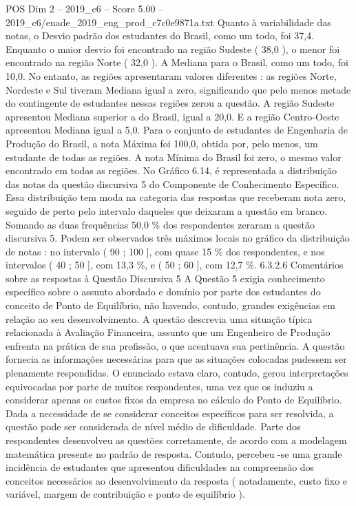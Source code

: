 \begin{textsample}{POS Dim 2 – 2019\_c6 – Score 5.00 – 2019\_c6/enade\_2019\_eng\_prod\_c7c0e9871a.txt}
Quanto à variabilidade das notas, o Desvio padrão dos estudantes do Brasil, como um todo, foi 37,4.
Enquanto o maior desvio foi encontrado na região Sudeste ( 38,0 ), o menor foi encontrado na região Norte ( 32,0 ).
A Mediana para o Brasil, como um todo, foi 10,0.
No entanto, as regiões apresentaram valores diferentes : as regiões Norte, Nordeste e Sul tiveram Mediana igual a zero, significando que pelo menos metade do contingente de estudantes nessas regiões zerou a questão.
A região Sudeste apresentou Mediana superior a do Brasil, igual a 20,0.
E a região Centro-Oeste apresentou Mediana igual a 5,0.
Para o conjunto de estudantes de Engenharia de Produção do Brasil, a nota Máxima foi 100,0, obtida por, pelo menos, um estudante de todas as regiões.
A nota Mínima do Brasil foi zero, o mesmo valor encontrado em todas as regiões.
No Gráfico 6.14, é representada a distribuição das notas da questão discursiva 5 do Componente de Conhecimento Específico.
Essa distribuição tem moda na categoria das respostas que receberam nota zero, seguido de perto pelo intervalo daqueles que deixaram a questão em branco.
Somando as duas frequências 50,0 \% dos respondentes zeraram a questão discursiva 5.
Podem ser observados três máximos locais no gráfico da distribuição de notas : no intervalo ( 90 ; 100 ], com quase 15 \% dos respondentes, e nos intervalos ( 40 ; 50 ], com 13,3 \%, e ( 50 ; 60 ], com 12,7 \%. 6.3.2.6 Comentários sobre as respostas à Questão Discursiva 5 A Questão 5 exigia conhecimento específico sobre o assunto abordado e domínio por parte dos estudantes do conceito de Ponto de Equilíbrio, não havendo, contudo, grandes exigências em relação ao seu desenvolvimento.
A questão descrevia uma situação típica relacionada à Avaliação Financeira, assunto que um Engenheiro de Produção enfrenta na prática de sua profissão, o que acentuava sua pertinência.
A questão fornecia as informações necessárias para que as situações colocadas pudessem ser plenamente respondidas.
O enunciado estava claro, contudo, gerou interpretações equivocadas por parte de muitos respondentes, uma vez que os induziu a considerar apenas os custos fixos da empresa no cálculo do Ponto de Equilíbrio.
Dada a necessidade de se considerar conceitos específicos para ser resolvida, a questão pode ser considerada de nível médio de dificuldade.
Parte dos respondentes desenvolveu as questões corretamente, de acordo com a modelagem matemática presente no padrão de resposta.
Contudo, percebeu -se uma grande incidência de estudantes que apresentou dificuldades na compreensão dos conceitos necessários ao desenvolvimento da resposta ( notadamente, custo fixo e variável, margem de contribuição e ponto de equilíbrio ).

\end{textsample}
